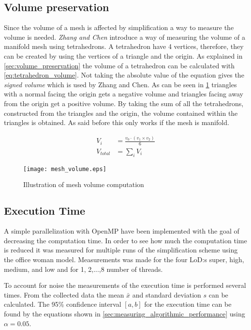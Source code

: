 \subsection{Volume preservation} \label{sec:computing_volume}
Since the volume of a mesh is affected by simplification a way to measure the volume is needed. \emph{Zhang and Chen} \cite{zhang2001efficient} introduce a way of measuring the volume of a manifold mesh using tetrahedrons. A tetrahedron have 4 vertices, therefore, they can be created by using the vertices of a triangle and the origin. As explained in \cref{sec:volume_preservation} the volume of a tetrahedron can be calculated with \cref{eq:tetrahedron_volume}. Not taking the absolute value of the equation gives the \emph{signed volume} which is used by Zhang and Chen. As can be seen in \cref{fig:mesh_volume} triangles with a normal facing the origin gets a negative volume and triangles facing away from the origin get a positive volume. By taking the sum of all the tetrahedrons, constructed from the triangles and the origin, the volume contained within the triangles is obtained. As said before this only works if the mesh is manifold.

\begin{align}
  V_i &= \frac{v_0 \cdot (v_1 \times v_2)}{6}\\
  V_{total} &= \sum_i{V_i}
\end{align}

\begin{figure}[h]
  \centering
  \texttt{[image: mesh\_volume.eps]}
  \caption{Illustration of mesh volume computation}
  \label{fig:mesh_volume}
  \end{figure}


\subsection{Execution Time} \label{sec:computation_time}
A simple parallelization with OpenMP have been implemented with the goal of decreasing the computation time. In order to see how much the computation time is reduced it was measured for multiple runs of the simplification scheme using the office woman model. Measurements was made for the four LoD:s super, high, medium, and low and for 1, 2,...,8 number of threads.

To account for noise the measurements of the execution time is performed several times. From the collected data the mean \(\bar{x}\) and standard deviation \(s\) can be calculated. The 95\% confidence interval \([a, b]\) for the execution time can be found by the equations shown in \cref{sec:measuring_algorithmic_performance} using \(\alpha = 0.05\).


